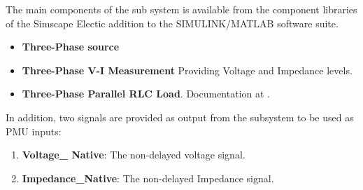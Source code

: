 The main components of the sub system is available from the component libraries of the Simscape Electic addition to the SIMULINK/MATLAB software suite.
\begin{itemize}
    \item \textbf{Three-Phase source} 
    \item \textbf{Three-Phase V-I Measurement}  Providing Voltage and Impedance levels.
    \item \textbf{Three-Phase Parallel RLC Load}. Documentation at \cite{mathworksImplementThreephase}. 
\end{itemize}
In addition, two signals are provided as output from the subsystem to be used as PMU inputs:
\begin{enumerate}
    \item \textbf{Voltage\_ Native}: The non-delayed voltage signal.
    \item \textbf{Impedance\_Native}: The non-delayed Impedance signal.
\end{enumerate}

